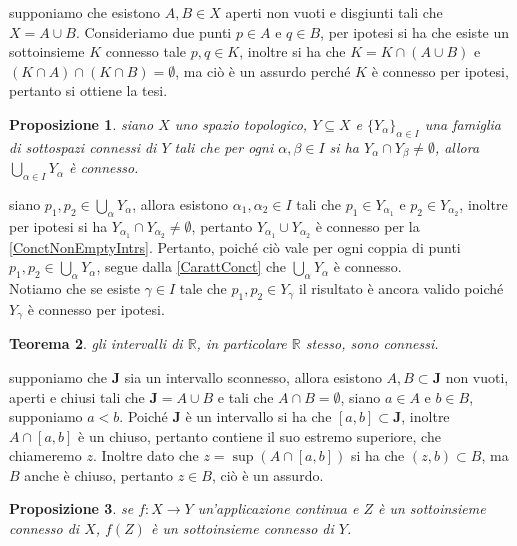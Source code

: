 \documentclass[oneside, 11pt]{amsbook}
\makeatletter
\newcommand{\0}{{(0)}}
\newcommand{\3}{{(3)}}
\theoremstyle{colonplain}
\newtheorem{thm}{Teorema}[chapter]
\newtheorem{prop}[thm]{Proposizione}
\theoremstyle{colondefinition}
\theoremstyle{colonremark}
\numberwithin{equation}{chapter}
\renewcommand{\proofname}{Dimostrazione}
\renewenvironment{proof}[1][\proofname]{\par
  \pushQED{\qed}%
  \normalfont \topsep6\p@\@plus6\p@\relax
  \trivlist
  \item[\hskip\labelsep\bfseries #1:]\ignorespaces
}{%
  \popQED\endtrivlist\@endpefalse
}
\makeatother
\begin{document}
\begin{proof}
supponiamo che esistono $A, B \in X$ aperti non vuoti e disgiunti tali che $X = A \cup B$. Consideriamo due punti $p \in A$ e $q \in B$, per ipotesi si ha che esiste un sottoinsieme $K$ connesso tale $p, q \in K$, inoltre si ha che $K = K \cap (A \cup B)$ e $(K \cap A) \cap (K \cap B) = \emptyset$, ma ciò è un assurdo perché $K$ è connesso per ipotesi, pertanto si ottiene la tesi.
\end{proof}
\begin{prop}
siano $X$ uno spazio topologico, $Y \subseteq X$ e $\{ Y_\alpha \}_{\alpha \in I}$ una famiglia di sottospazi connessi di $Y$ tali che per ogni $\alpha, \beta \in I$ si ha $Y_\alpha \cap Y_\beta \neq \emptyset$, allora $\bigcup_{\alpha \in I} Y_\alpha$ è connesso.
\end{prop}
\begin{proof}
siano $p_1, p_2 \in \bigcup_\alpha Y_\alpha$, allora esistono $\alpha_1, \alpha_2 \in I$ tali che $p_1 \in Y_{\alpha_1}$ e $p_2 \in Y_{\alpha_2}$, inoltre per ipotesi si ha $Y_{\alpha_1} \cap Y_{\alpha_2} \neq \emptyset$, pertanto $Y_{\alpha_1} \cup Y_{\alpha_2}$ è connesso per la \ref{ConctNonEmptyIntrs}. Pertanto, poiché ciò vale per ogni coppia di punti $p_1, p_2 \in \bigcup_\alpha Y_\alpha$, segue dalla \ref{CarattConct} che $\bigcup_\alpha Y_\alpha$ è connesso. \\
Notiamo che se esiste $\gamma \in I$ tale che $p_1, p_2 \in Y_\gamma$ il risultato è ancora valido poiché $Y_\gamma$ è connesso per ipotesi.
\end{proof}
\begin{thm}
gli intervalli di $\mathbb{R}$, in particolare $\mathbb{R}$ stesso, sono connessi.
\end{thm}
\begin{proof}
supponiamo che $\mathbf{J}$ sia un intervallo sconnesso, allora esistono $A, B \subset \mathbf{J}$ non vuoti, aperti e chiusi tali che $\mathbf{J} = A \cup B$ e tali che $A \cap B = \emptyset$, siano $a \in A$ e $b \in B$, supponiamo $a < b$. Poiché $\mathbf{J}$ è un intervallo si ha che $[a, b] \subset \mathbf{J}$, inoltre $A \cap [a, b]$ è un chiuso, pertanto contiene il suo estremo superiore, che chiameremo $z$. Inoltre dato che $z = \sup (A \cap [a, b])$ si ha che $(z, b) \subset B$, ma $B$ anche è chiuso, pertanto $z \in B$, ciò è un assurdo.
\end{proof}
\begin{prop}
se $f : X \longrightarrow Y$ un'applicazione continua e $Z$ è un sottoinsieme connesso di $X$, $f(Z)$ è un sottoinsieme connesso di $Y$.
\end{prop}
\end{document}
